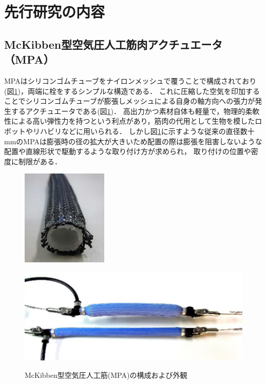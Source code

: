 \newpage
\section{先行研究の内容}
\subsection{McKibben型空気圧人工筋肉アクチュエータ（MPA）}
MPAはシリコンゴムチューブをナイロンメッシュで覆うことで構成されており(図\ref{fig:MPA})，両端に栓をするシンプルな構造である．
これに圧縮した空気を印加することでシリコンゴムチューブが膨張しメッシュによる自身の軸方向への張力が発生するアクチュエータである(図\ref{fig:MPA})．
高出力かつ素材自体も軽量で，物理的柔軟性による高い弾性力を持つという利点があり，筋肉の代用として生物を模したロボットやリハビリなどに用いられる．
しかし図\ref{fig:MPA}に示すような従来の直径数十 mmのMPAは膨張時の径の拡大が大きいため配置の際は膨張を阻害しないような配置や直線形状で駆動するような取り付け方が求められ，
取り付けの位置や密度に制限がある．
\begin{figure}[b]
  \begin{minipage}{0.49\columnwidth}
    \vspace{4mm}
    \centering
    \includegraphics[scale=1]{image/MPA_kousei.png}
    \vspace{3mm}
    \label{fig:Structure}
  \end{minipage}
  \begin{minipage}{0.49\columnwidth}
    \vspace{25mm}
    \centering
    \includegraphics[scale=.8]{image/MPA_dousa.png}
    \label{fig:move}
  \end{minipage}
  \caption{McKibben型空気圧人工筋(MPA)の構成および外観\cite{中西大輔2020}}
  \label{fig:MPA}
\end{figure}
